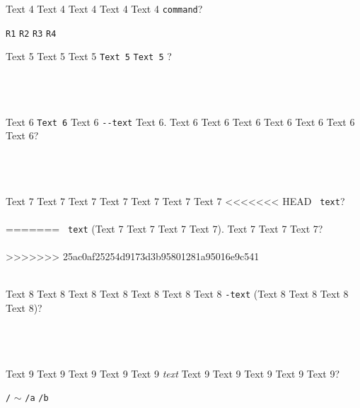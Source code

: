 \documentclass[9pt]{exam}
\begin{document}
\begin{questions}
\question
    Text 4 Text 4 Text 4 Text 4 Text 4 \texttt{command}?\\
    \begin{oneparchoices}
     \choice \texttt{R1}
     \choice \texttt{R2}
     \choice \texttt{R3}
     \choice \texttt{R4}
    \end{oneparchoices}

\question
    Text 5 Text 5 Text 5 \textquotedbl{}\texttt{Text 5}\textquotedbl{} 
    \textquotedbl{}\texttt{Text 5}\textquotedbl{} ?\\\\
    \makebox[0.9\textwidth]{\$ \enspace\hrulefill}\\\\
    \makebox[0.9\textwidth]{\enspace\hrulefill}

\question
    Text 6 \texttt{Text 6} Text 6 \texttt{-{}-text} Text 6.
    Text 6 Text 6 Text 6 Text 6 Text 6 Text 6 Text 6?\\\\
    \makebox[0.9\textwidth]{\$ \enspace\hrulefill}\\\\
    \makebox[0.9\textwidth]{\enspace\hrulefill}

\question
    Text 7 Text 7 Text 7 Text 7 Text 7 Text 7 Text 7
<<<<<<< HEAD
    \texttt{\textquotesingle{} text\textquotesingle{}}?\\\\
=======
    \texttt{\textquotesingle{} text\textquotesingle{}}
    (Text 7 Text 7 Text 7 Text 7). Text 7 Text 7 Text 7?\\\\
>>>>>>> 25ac0af25254d9173d3b95801281a95016e9c541
    \makebox[0.9\textwidth]{\$ \enspace\hrulefill}\\\\
    \makebox[0.9\textwidth]{\enspace\hrulefill}

\question
    Text 8 Text 8 Text 8 Text 8 Text 8 Text 8 Text 8
    \texttt{\textquotesingle{}-text\textquotesingle{}}
    (Text 8 Text 8 Text 8 Text 8)?\\\\
    \makebox[0.9\textwidth]{\$ \enspace\hrulefill}\\\\
    \makebox[0.9\textwidth]{\enspace\hrulefill}

\question
    Text 9 Text 9 Text 9 Text 9 Text 9 \emph{text}
    Text 9 Text 9 Text 9 Text 9 Text 9?\\
    \begin{oneparchoices}
     \choice \texttt{/}
     \choice \texttt{$\sim$}
     \choice \texttt{/a}
     \choice \texttt{/b}
    \end{oneparchoices}


\end{questions}
\end{document}
